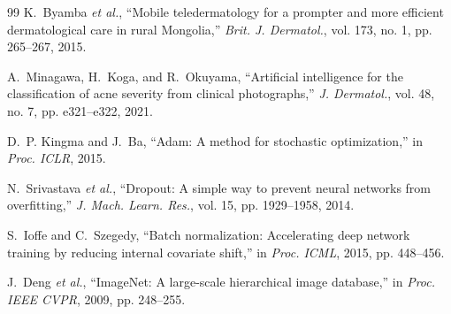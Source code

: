 \documentclass[10pt,conference]{IEEEtran}
\begin{document}
\begin{thebibliography}{99}
K.~Byamba \emph{et al.}, ``Mobile teledermatology for a prompter and more efficient dermatological care in rural Mongolia,'' \emph{Brit. J. Dermatol.}, vol. 173, no. 1, pp. 265--267, 2015.

A.~Minagawa, H.~Koga, and R.~Okuyama, ``Artificial intelligence for the classification of acne severity from clinical photographs,'' \emph{J. Dermatol.}, vol. 48, no. 7, pp. e321--e322, 2021.

D.~P. Kingma and J.~Ba, ``Adam: A method for stochastic optimization,'' in \emph{Proc. ICLR}, 2015.

N.~Srivastava \emph{et al.}, ``Dropout: A simple way to prevent neural networks from overfitting,'' \emph{J. Mach. Learn. Res.}, vol. 15, pp. 1929--1958, 2014.

S.~Ioffe and C.~Szegedy, ``Batch normalization: Accelerating deep network training by reducing internal covariate shift,'' in \emph{Proc. ICML}, 2015, pp. 448--456.

J.~Deng \emph{et al.}, ``ImageNet: A large-scale hierarchical image database,'' in \emph{Proc. IEEE CVPR}, 2009, pp. 248--255.
\end{thebibliography}
\end{document}
